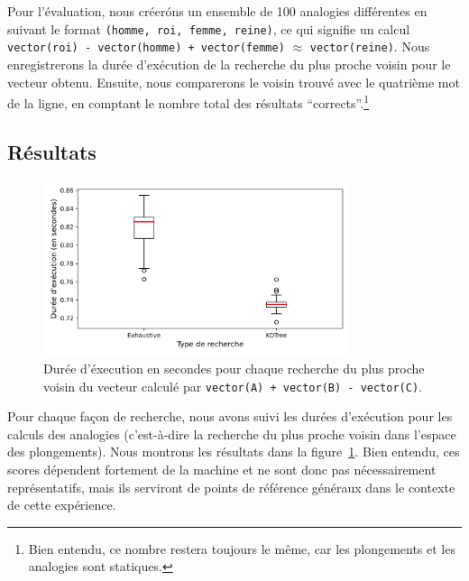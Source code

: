 \documentclass[12pt]{article}
\begin{document}

Pour l'évaluation, nous créeróns un ensemble de 100 analogies différentes en suivant le format \texttt{(homme, roi, femme, reine)}, ce qui signifie un calcul \texttt{vector(roi) - vector(homme) + vector(femme)} $\approx$ \texttt{vector(reine)}. Nous enregistrerons la durée d'exécution de la recherche du plus proche voisin pour le vecteur obtenu. Ensuite, nous comparerons le voisin trouvé avec le quatrième mot de la ligne, en comptant le nombre total des résultats ``corrects''.\footnote{Bien entendu, ce nombre restera toujours le même, car les plongements et les analogies sont statiques.}

\subsection{Résultats} \label{résultats-2}

\begin{figure}[htpb]
    \centering
    \includegraphics[width=0.8\textwidth]{img/times.png}
    \caption{Durée d'éxecution en secondes pour chaque recherche du plus proche voisin du vecteur calculé par \texttt{vector(A) + vector(B) - vector(C)}.}
    \label{fig:times}
\end{figure}

Pour chaque façon de recherche, nous avons suivi les durées d'exécution pour les calculs des analogies (c'est-à-dire la recherche du plus proche voisin dans l'espace des plongements). Nous montrons les résultats dans la figure~\ref{fig:times}. Bien entendu, ces scores dépendent fortement de la machine et ne sont donc pas nécessairement représentatifs, mais ils serviront de points de référence généraux dans le contexte de cette expérience. 
\end{document}
